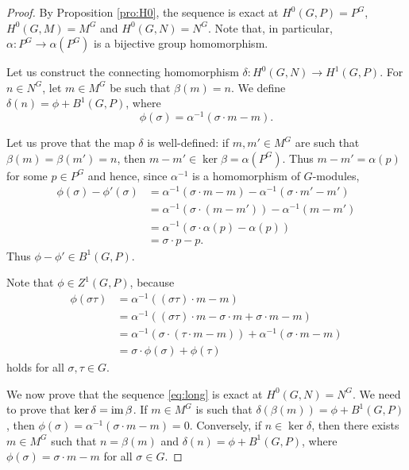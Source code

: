 \begin{proof}
    By Proposition \ref{pro:H0}, the 
    sequence is exact at $H^0(G,P)=P^G$, 
    $H^0(G,M)=M^G$ and 
    $H^0(G,N)=N^G$. Note that, in particular, 
    $\alpha\colon P^G\to\alpha(P^G)$ is a bijective group homomorphism. 


    Let us construct the connecting
    homomorphism $\delta\colon H^0(G,N)\to H^1(G,P)$. For 
    $n\in N^G$, let $m\in M^G$ be such that 
    $\beta(m)=n$. We define $\delta(n)=\phi+B^1(G,P)$, where 
    \[
    \phi(\sigma)=\alpha^{-1}(\sigma\cdot m-m).
    \]


    Let us prove that the map $\delta$ is well-defined: if $m,m'\in M^G$ are such that
    $\beta(m)=\beta(m')=n$, then  $m-m'\in\ker\beta=\alpha(P^G)$. Thus 
    $m-m'=\alpha(p)$ for some $p\in P^G$ and hence, 
    since $\alpha^{-1}$ is a homomorphism of $G$-modules, 
    \begin{align*}
    \phi(\sigma)-\phi'(\sigma)&=\alpha^{-1}(\sigma\cdot m-m)
    -\alpha^{-1}(\sigma\cdot m'-m')\\
    &=\alpha^{-1}(\sigma\cdot (m-m'))-\alpha^{-1}(m-m')\\
    &=\alpha^{-1}(\sigma\cdot\alpha(p)-\alpha(p))\\
    &=\sigma\cdot p-p.
    \end{align*}
    Thus $\phi-\phi'\in B^1(G,P)$. 

    Note that $\phi\in Z^1(G,P)$, because
    \begin{align*}
    \phi(\sigma\tau)&=\alpha^{-1}((\sigma\tau)\cdot m-m)\\
    &=\alpha^{-1}((\sigma\tau)\cdot m-\sigma\cdot m+\sigma\cdot m-m)\\
    &=\alpha^{-1}(\sigma\cdot (\tau\cdot m-m))+\alpha^{-1}(\sigma\cdot m-m)\\
    &=\sigma\cdot\phi(\sigma)+\phi(\tau)
    \end{align*}
    holds for all $\sigma,\tau\in G$. 
    
    We now prove that the sequence \eqref{eq:long}
    is exact at $H^0(G,N)=N^G$. We need to prove that $\ker\delta=\operatorname{im}\beta$. If $m\in M^G$ is such that 
    $\delta(\beta(m))=\phi+B^1(G,P)$, then $\phi(\sigma)=\alpha^{-1}(\sigma\cdot m-m)=0$. Conversely, 
    if $n\in\ker\delta$, then there exists $m\in M^G$ such that $n=\beta(m)$ and 
    $\delta(n)=\phi+B^1(G,P)$, where $\phi(\sigma)=\sigma\cdot m-m$
    for all $\sigma\in G$. 


\end{proof}
